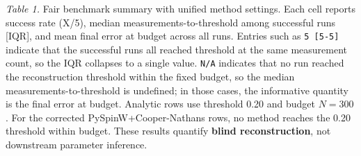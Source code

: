\documentclass[
]{article}
\begin{document}
\emph{Table 1.} Fair benchmark summary with unified method settings.
Each cell reports success rate (X/5), median measurements-to-threshold
among successful runs {[}IQR{]}, and mean final error at budget across
all runs. Entries such as \texttt{5\ {[}5-5{]}} indicate that the
successful runs all reached threshold at the same measurement count, so
the IQR collapses to a single value. \texttt{N/A} indicates that no run
reached the reconstruction threshold within the fixed budget, so the
median measurements-to-threshold is undefined; in those cases, the
informative quantity is the final error at budget. Analytic rows use
threshold 0.20 and budget \(N=300\). For the corrected
PySpinW+Cooper-Nathans rows, no method reaches the 0.20 threshold within
budget. These results quantify \textbf{blind reconstruction}, not
downstream parameter inference.
\end{document}
